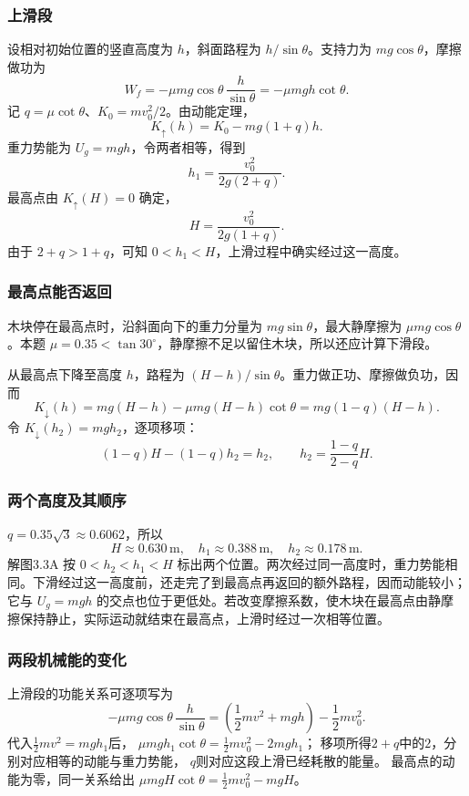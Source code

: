 \documentclass[UTF8,fontset=fandol,a4paper,11pt]{ctexart}
\begin{document}
\subsubsection*{上滑段}
设相对初始位置的竖直高度为 $h$，斜面路程为 $h/\sin\theta$。支持力为 $mg\cos\theta$，摩擦做功为
\[
W_f=-\mu mg\cos\theta\,\frac{h}{\sin\theta}
=-\mu mgh\cot\theta.
\]
记 $q=\mu\cot\theta$、$K_0=mv_0^2/2$。由动能定理，
\[
K_{\uparrow}(h)=K_0-mg(1+q)h.
\]
重力势能为 $U_g=mgh$，令两者相等，得到
\[
\boxed{h_1=\frac{v_0^2}{2g(2+q)}}.
\]
最高点由 $K_{\uparrow}(H)=0$ 确定，
\[
H=\frac{v_0^2}{2g(1+q)}.
\]
由于 $2+q>1+q$，可知 $0<h_1<H$，上滑过程中确实经过这一高度。

\subsubsection*{最高点能否返回}
木块停在最高点时，沿斜面向下的重力分量为 $mg\sin\theta$，最大静摩擦为 $\mu mg\cos\theta$。本题 $\mu=0.35<\tan30^\circ$，静摩擦不足以留住木块，所以还应计算下滑段。

从最高点下降至高度 $h$，路程为 $(H-h)/\sin\theta$。重力做正功、摩擦做负功，因而
\[
K_{\downarrow}(h)=mg(H-h)-\mu mg(H-h)\cot\theta
=mg(1-q)(H-h).
\]
令 $K_{\downarrow}(h_2)=mgh_2$，逐项移项：
\[
(1-q)H-(1-q)h_2=h_2,\qquad
\boxed{h_2=\frac{1-q}{2-q}H}.
\]

\subsubsection*{两个高度及其顺序}
$q=0.35\sqrt3\approx0.6062$，所以
\[
H\approx0.630\,\mathrm m,\quad
\boxed{h_1\approx0.388\,\mathrm m,\quad h_2\approx0.178\,\mathrm m}.
\]
解图3.3A 按 $0<h_2<h_1<H$ 标出两个位置。两次经过同一高度时，重力势能相同。下滑经过这一高度前，还走完了到最高点再返回的额外路程，因而动能较小；它与 $U_g=mgh$ 的交点也位于更低处。若改变摩擦系数，使木块在最高点由静摩擦保持静止，实际运动就结束在最高点，上滑时经过一次相等位置。
\subsubsection*{两段机械能的变化}
上滑段的功能关系可逐项写为
\[
-\mu mg\cos\theta\,\frac h{\sin\theta}
=\left(\frac12mv^2+mgh\right)-\frac12mv_0^2.
\]
代入$\frac12mv^2=mgh_1$后，
$\mu mgh_1\cot\theta=\frac12mv_0^2-2mgh_1$；
移项所得$2+q$中的$2$，分别对应相等的动能与重力势能，
$q$则对应这段上滑已经耗散的能量。
最高点的动能为零，同一关系给出
$\mu mgH\cot\theta=\frac12mv_0^2-mgH$。
\end{document}
